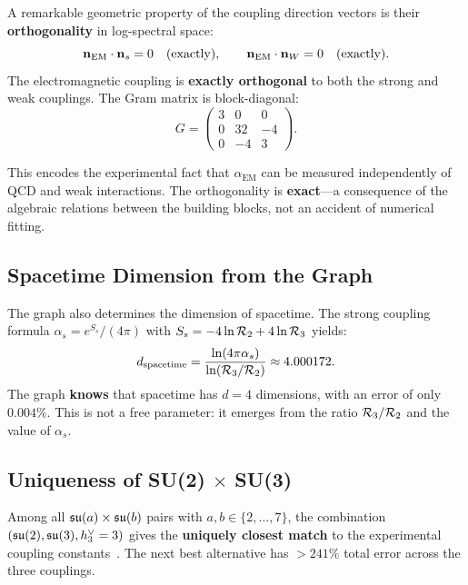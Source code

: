 A remarkable geometric property of the coupling direction vectors is their \textbf{orthogonality} in log-spectral space:
\begin{equation}
\mathbf{n}_{\mathrm{EM}} \cdot \mathbf{n}_s = 0 \quad \text{(exactly)}, \qquad
\mathbf{n}_{\mathrm{EM}} \cdot \mathbf{n}_W = 0 \quad \text{(exactly)}.
\end{equation}
The electromagnetic coupling is \textbf{exactly orthogonal} to both the strong and weak couplings. The Gram matrix is block-diagonal:
\begin{equation}
G = \begin{pmatrix}
3 & 0 & 0 \\
0 & 32 & -4 \\
0 & -4 & 3
\end{pmatrix}.
\end{equation}

This encodes the experimental fact that $\alpha_{\mathrm{EM}}$ can be measured independently of QCD and weak interactions. The orthogonality is \textbf{exact}---a consequence of the algebraic relations between the building blocks, not an accident of numerical fitting.

\subsection{Spacetime Dimension from the Graph}\label{sec:spacetime_dimension}

The graph also determines the dimension of spacetime. The strong coupling formula $\alpha_s = e^{S_s}/(4\pi)$ with $S_s = -4\ln\mathcal{R}_2 + 4\ln\mathcal{R}_3$ yields:
\begin{equation}
d_{\mathrm{spacetime}} = \frac{\ln(4\pi\alpha_s)}{\ln(\mathcal{R}_3/\mathcal{R}_2)} \approx 4.000172.
\end{equation}
The graph \textbf{knows} that spacetime has $d = 4$ dimensions, with an error of only $0.004\%$. This is not a free parameter: it emerges from the ratio $\mathcal{R}_3/\mathcal{R}_2$ and the value of $\alpha_s$.

\subsection{Uniqueness of SU(2) $\times$ SU(3)}\label{sec:uniqueness}

Among all $\mathfrak{su}(a) \times \mathfrak{su}(b)$ pairs with $a, b \in \{2, \ldots, 7\}$, the combination $(\mathfrak{su}(2), \mathfrak{su}(3), h^\vee_3 = 3)$ gives the \textbf{uniquely closest match} to the experimental coupling constants~\cite{pdg2024}. The next best alternative has $> 241\%$ total error across the three couplings.

